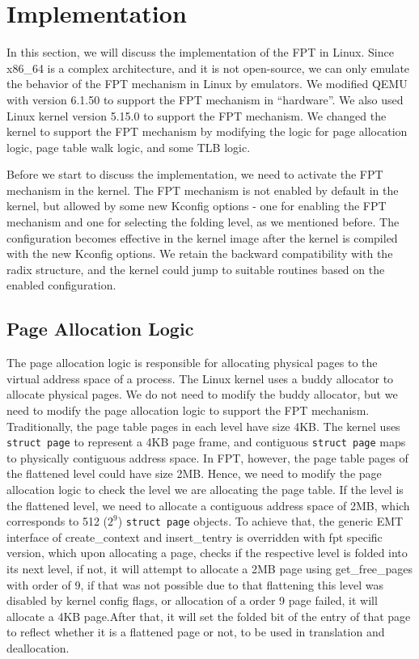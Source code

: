\section{Implementation}


In this section, we will discuss the implementation of the FPT in Linux. Since x86\_64 is a complex architecture, and it is not open-source, we can only emulate the behavior of the FPT mechanism in Linux by emulators. We modified QEMU with version 6.1.50 to support the FPT mechanism in ``hardware''. We also used Linux kernel version 5.15.0 to support the FPT mechanism. We changed the kernel to support the FPT mechanism by modifying the logic for page allocation logic, page table walk logic, and some TLB logic.

Before we start to discuss the implementation, we need to activate the FPT mechanism in the kernel. The FPT mechanism is not enabled by default in the kernel, but allowed by some new Kconfig options - one for enabling the FPT mechanism and one for selecting the folding level, as we mentioned before. The configuration becomes effective in the kernel image after the kernel is compiled with the new Kconfig options. We retain the backward compatibility with the radix structure, and the kernel could jump to suitable routines based on the enabled configuration.

\subsection{Page Allocation Logic}

The page allocation logic is responsible for allocating physical pages to the virtual address space of a process. The Linux kernel uses a buddy allocator to allocate physical pages. We do not need to modify the buddy allocator, but we need to modify the page allocation logic to support the FPT mechanism. Traditionally, the page table pages in each level have size 4KB. The kernel uses \texttt{struct page} to represent a 4KB page frame, and contiguous \texttt{struct page} maps to physically contiguous address space. In FPT, however, the page table pages of the flattened level could have size 2MB. Hence, we need to modify the page allocation logic to check the level we are allocating the page table. If the level is the flattened level, we need to allocate a contiguous address space of 2MB, which corresponds to 512 ($2^9$) \texttt{struct page} objects. To achieve that, the generic EMT interface of create_context and insert_tentry is overridden with fpt specific version, which upon allocating a page, checks if the respective level is folded into its next level, if not, it will attempt to allocate a 2MB page using get_free_pages with order of 9, if that was not possible due to that flattening this level was disabled by kernel config flags, or allocation of a order 9 page failed, it will allocate a 4KB page.After that, it will set the folded bit of the entry of that page to reflect whether it is a flattened page or not, to be used in translation and deallocation.

